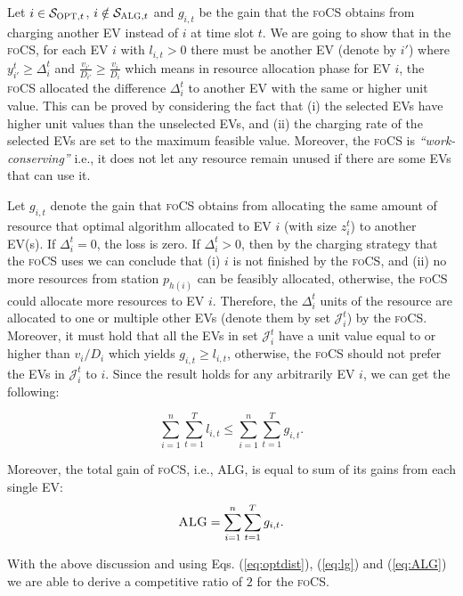 \documentclass[journal]{IEEEtran}
\newcommand{\rev}[1]{{\color{black}#1}}%
\newcommand{\rev}[1]{#1}
\newcommand{\focs}{\textsc{foCS}\xspace}
\newcommand{\opt}{\textsc{OPT}\xspace}
\newcommand{\alg}{\textsc{ALG}\xspace}
\begin{document}
Let $i\in\mathcal{S}_{\opt,t}$, $i\notin\mathcal{S}_{\alg,t}$ and $g_{i,t}$ be the gain that the \focs obtains from charging another EV instead of $i$ at time slot $t$. We are going to show that in the \focs, for each EV $i$ with $l_{i,t}>0$ there must be another EV (denote by $i'$) where $y_{i'}^t\geq \Delta_i^t$ and $\frac{v_{i'}}{D_{i'}}\geq \frac{v_i}{D_i}$ which means in resource allocation phase for EV $i$, the \focs allocated the difference $\Delta_i^t$ to another EV with the same or higher unit value. This can be proved by considering the fact that (i) the selected EVs have higher unit values than the unselected EVs, and (ii) the charging rate of the selected EVs are set to the maximum feasible value. Moreover, the \focs is \emph{``work-conserving''} i.e., it does not let any resource remain unused if there are some EVs that can use it. 

Let $g_{i,t}$ denote the gain that \focs obtains from allocating the same amount of resource that optimal algorithm allocated to EV $i$ (with size $z_i^t$) to another EV(s).
If $\Delta_{i}^t=0$, the loss is zero. If $\Delta_{i}^t>0$, then by the charging strategy that the \focs uses we can conclude that (i) $i$ is not finished by the \focs, and (ii)
\rev{no more resources from station $p_{h(i)}$ can be feasibly allocated,} otherwise, the \focs could allocate more resources to EV $i$. Therefore, the $\Delta_{i}^t$ units of the resource \rev{are} allocated to one or multiple other EVs (denote them by set $\mathcal{J}_i^t$) by the \focs. Moreover, it must hold that all the EVs in set $\mathcal{J}_i^t$ have a unit value equal to or higher than $v_i/D_i$ which yields $g_{i,t}\geq l_{i,t}$, otherwise, the \focs should not prefer the EVs in $\mathcal{J}_i^t$ to $i$. \rev{Since the result holds for any arbitrarily EV $i$, we can get the following:}

\begin{equation}
\label{eq:lg}
\sum_{i=1}^n\sum_{t=1}^Tl_{i,t}\leq\sum_{i=1}^n\sum_{t=1}^Tg_{i,t}.
\end{equation}

Moreover, the total gain of \focs, i.e., \alg, is equal to sum of its gains from each single EV:
\begin{equation}
\label{eq:ALG}
\rev{\alg= \sum_{i=1}^n\sum_{t=1}^Tg_{i,t}.}
\end{equation}

With the above discussion and using Eqs. (\ref{eq:optdist}), (\ref{eq:lg}) and (\ref{eq:ALG}) we are able to derive a competitive ratio of $2$ for the \focs. 
\end{document}
